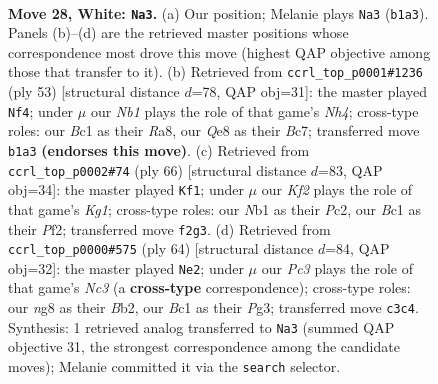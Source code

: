 \documentclass[11pt]{article}
\begin{document}
\clearpage

\begin{figure}[p]\centering
\begin{subfigure}{0.46\textwidth}\centering
\resizebox{\linewidth}{!}{%
\newchessgame
\chessboard[
  setfen={4Q1nr/1kr3p1/8/2p3Pp/5P1P/2P5/PP3K2/RNB4q w - - 5 28},
  showmover=false,
  pgfstyle=straightmove, color=movearrow, markmove={b1-a3}
]}
\caption{}
\end{subfigure}\hfill
\begin{subfigure}{0.46\textwidth}\centering
\resizebox{\linewidth}{!}{%
\newchessgame
\chessboard[
  setfen={r5k1/ppb3p1/4p2p/4Np1n/q7/5P2/PPP2Q2/1K1RR3 b - - 3 27},
  showmover=false,
  pgfstyle=straightmove, color=movearrow, markmove={h5-f4}
]}
\caption{}
\end{subfigure}
\\[4pt]
\begin{subfigure}{0.46\textwidth}\centering
\resizebox{\linewidth}{!}{%
\newchessgame
\chessboard[
  setfen={6kr/1p4p1/p7/P1BRpr1p/1P6/7P/2P2PP1/6K1 w - - 3 34},
  showmover=false,
  pgfstyle=straightmove, color=movearrow, markmove={g1-f1}
]}
\caption{}
\end{subfigure}\hfill
\begin{subfigure}{0.46\textwidth}\centering
\resizebox{\linewidth}{!}{%
\newchessgame
\chessboard[
  setfen={3r3k/1R4p1/6rp/5p2/P1n5/2N1P1P1/1B3P1P/6K1 w - - 3 33},
  showmover=false,
  pgfstyle=straightmove, color=movearrow, markmove={c3-e2}
]}
\caption{}
\end{subfigure}
\caption{\textbf{Move 28, White: \texttt{Na3}.} (a) Our position; Melanie plays \texttt{Na3} (\texttt{b1a3}). Panels (b)--(d) are the retrieved master positions whose correspondence most drove this move (highest QAP objective among those that transfer to it). (b) Retrieved from \texttt{ccrl\_top\_p0001\#1236} (ply 53) [structural distance $d$=78, QAP obj=31]: the master played \texttt{Nf4}; under $\mu$ our \emph{Nb1} plays the role of that game's \emph{Nh4}; cross-type roles: our \emph{B}c1 as their \emph{R}a8, our \emph{Q}e8 as their \emph{B}c7; transferred move \texttt{b1a3} \textbf{(endorses this move)}. (c) Retrieved from \texttt{ccrl\_top\_p0002\#74} (ply 66) [structural distance $d$=83, QAP obj=34]: the master played \texttt{Kf1}; under $\mu$ our \emph{Kf2} plays the role of that game's \emph{Kg1}; cross-type roles: our \emph{N}b1 as their \emph{P}c2, our \emph{B}c1 as their \emph{P}f2; transferred move \texttt{f2g3}. (d) Retrieved from \texttt{ccrl\_top\_p0000\#575} (ply 64) [structural distance $d$=84, QAP obj=32]: the master played \texttt{Ne2}; under $\mu$ our \emph{Pc3} plays the role of that game's \emph{Nc3} (a \textbf{cross-type} correspondence); cross-type roles: our \emph{n}g8 as their \emph{B}b2, our \emph{B}c1 as their \emph{P}g3; transferred move \texttt{c3c4}. Synthesis: 1 retrieved analog transferred to \texttt{Na3} (summed QAP objective 31, the strongest correspondence among the candidate moves); Melanie committed it via the \texttt{search} selector.}
\label{fig:thought-m54}
\end{figure}
\end{document}
